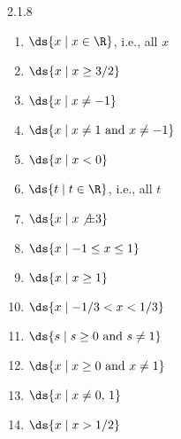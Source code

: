 \begin{Answer}{2.1.8}
\begin{enumerate}
	\item	$\ds \{x\mid x\in \R\}$, i.e., all $x$
	\item	$\ds \{x\mid x\ge 3/2\}$
	\item	$\ds \{x\mid x\not=-1\}$
	\item	$\ds \{x\mid x\not=1 \hbox{ and } x\not=-1\}$
	\item	$\ds \{x\mid x<0\}$
	\item	$\ds \{t\mid t\in \R\}$, i.e., all $t$
	\item	$\ds \{x\mid x\not \pm 3\}$
	\item	$\ds \{x\mid -1\le x\le 1\}$
	\item	$\ds \{x\mid x\ge 1\}$
	\item	$\ds \{x\mid -1/3< x< 1/3\}$
	\item	$\ds \{s\mid s\ge0  \hbox{ and } s\not=1\}$
	\item	$\ds \{x\mid x\ge0  \hbox{ and } x\not=1\}$
	\item  $\ds \{x\mid x\not=0,\, 1\}$
	\item  $\ds \{x\mid x> 1/2\}$
\end{enumerate}
\end{Answer}
